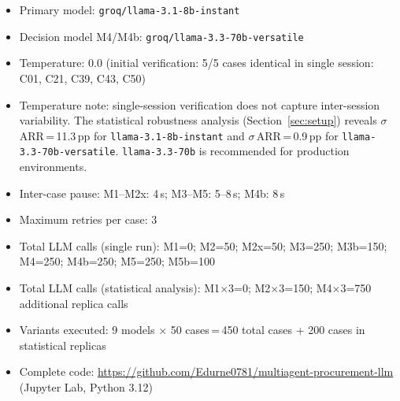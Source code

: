 \documentclass[preprint,12pt,authoryear]{elsarticle}
\begin{document}
\begin{itemize}
  \item Primary model: \texttt{groq/llama-3.1-8b-instant}
  \item Decision model M4/M4b: \texttt{groq/llama-3.3-70b-versatile}
  \item Temperature: 0.0 (initial verification: 5/5 cases identical in single
        session: C01, C21, C39, C43, C50)
  \item Temperature note: single-session verification does not capture
        inter-session variability.
        The statistical robustness analysis (Section~\ref{sec:setup}) reveals
        $\sigma$\,ARR\,=\,11.3\,pp for \texttt{llama-3.1-8b-instant} and
        $\sigma$\,ARR\,=\,0.9\,pp for \texttt{llama-3.3-70b-versatile}.
        \texttt{llama-3.3-70b} is recommended for production environments.
  \item Inter-case pause: M1--M2x: 4\,s; M3--M5: 5--8\,s; M4b: 8\,s
  \item Maximum retries per case: 3
  \item Total LLM calls (single run): M1=0; M2=50; M2x=50; M3=250; M3b=150;
        M4=250; M4b=250; M5=250; M5b=100
  \item Total LLM calls (statistical analysis): M1$\times$3=0;
        M2$\times$3=150; M4$\times$3=750 additional replica calls
  \item Variants executed: 9 models $\times$ 50 cases\,=\,450 total cases
        + 200 cases in statistical replicas
  \item Complete code: \url{https://github.com/Edurne0781/multiagent-procurement-llm}
        (Jupyter Lab, Python 3.12)
\end{itemize}
\end{document}
